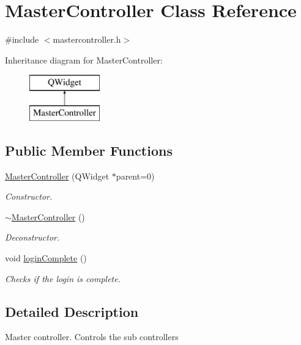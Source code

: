 \hypertarget{class_master_controller}{}\section{Master\+Controller Class Reference}
\label{class_master_controller}


{\ttfamily \#include $<$mastercontroller.\+h$>$}

Inheritance diagram for Master\+Controller\+:\begin{figure}[H]
\begin{center}
\leavevmode
\includegraphics[height=2.000000cm]{class_master_controller}
\end{center}
\end{figure}
\subsection*{Public Member Functions}
\begin{DoxyCompactItemize}
\item 
\mbox{\hyperlink{class_master_controller_a4503221125383b917c86863c3e40697b}{Master\+Controller}} (Q\+Widget $\ast$parent=0)
\begin{DoxyCompactList}\small\item\em Constructor. \end{DoxyCompactList}\item 
\mbox{\hyperlink{class_master_controller_a1224d024402d36a61e9bd7b89f434388}{$\sim$\+Master\+Controller}} ()
\begin{DoxyCompactList}\small\item\em Deconstructor. \end{DoxyCompactList}\item 
void \mbox{\hyperlink{class_master_controller_adb9bf0a49dd9010217c47834a98ec184}{login\+Complete}} ()
\begin{DoxyCompactList}\small\item\em Checks if the login is complete. \end{DoxyCompactList}\end{DoxyCompactItemize}


\subsection{Detailed Description}
Master controller. Controls the sub controllers 

